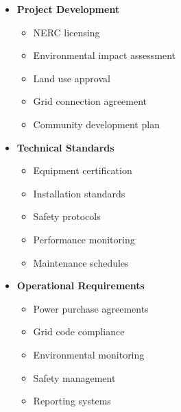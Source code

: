 \begin{tcolorbox}[
    colback=white,
    colframe=primarydark,
    title=\textbf{Renewable Energy Requirements},
    before skip=1em,
    after skip=1em
]
    \begin{itemize}[leftmargin=*,itemsep=0.5em]
        \item \textbf{Project Development}
        \begin{itemize}[itemsep=0.3em]
            \item NERC licensing
            \item Environmental impact assessment
            \item Land use approval
            \item Grid connection agreement
            \item Community development plan
        \end{itemize}

        \vspace{0.5em}

        \item \textbf{Technical Standards}
        \begin{itemize}[itemsep=0.3em]
            \item Equipment certification
            \item Installation standards
            \item Safety protocols
            \item Performance monitoring
            \item Maintenance schedules
        \end{itemize}

        \vspace{0.5em}

        \item \textbf{Operational Requirements}
        \begin{itemize}[itemsep=0.3em]
            \item Power purchase agreements
            \item Grid code compliance
            \item Environmental monitoring
            \item Safety management
            \item Reporting systems
        \end{itemize}
    \end{itemize}
\end{tcolorbox}

